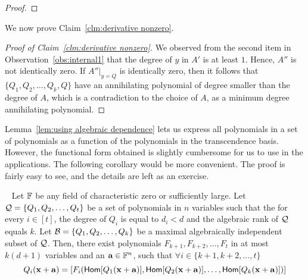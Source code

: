\begin{proof}
\end{proof}

We now prove Claim~\ref{clm:derivative nonzero}.
\begin{proof}[Proof of Claim~\ref{clm:derivative nonzero}]
We observed from the second item in Observation~\ref{obs:internal1} that the degree of $y$ in $A'$ is at least $1$. Hence, $A''$ is not identically zero.  
If $A''|_{y = Q}$ is identically zero, then it follows that $\{Q_1, Q_2, \ldots, Q_k, Q\}$ have an annihilating polynomial of degree smaller than the degree of $A$, which is a contradiction to the choice of $A$, as a minimum degree annihilating polynomial. 
\end{proof}

Lemma~\ref{lem:using algebraic dependence} lets us express all polynomials in a set of polynomials as a function of the polynomials in the transcendence basis. However, the functional form obtained is slightly cumbersome for us to use in the applications. The following corollary would be more convenient. The proof is fairly easy to see, and the details are left as an exercise. 

\begin{corollary}~\label{cor:using algebraic independence new}
Let $\mathbb{F}$ be any  field of characteristic zero or sufficiently large. Let ${\cal Q} = \{Q_1, Q_2, \ldots, Q_t\}$ be a set of polynomials in $n$ variables such that the for every $i \in [t]$, the degree of  $Q_i$ is equal to $d_i < d$ and  the algebraic rank of ${\cal Q}$ equals $k$. Let  ${\cal B} = \{Q_1, Q_2, \ldots, Q_k\}$ be a maximal algebraically independent subset of ${\cal Q}$. Then, there exist polynomials $F_{k+1}, F_{k+2}, \ldots, F_{t}$  in at most $k(d+1)$  variables and an $\mathbf{a} \in \mathbb{F}^n$, such that $\forall i \in \{k+1, k+2, \ldots, t\}$
$$Q_i(\mathbf{x} + \mathbf{a}) = \left[F_i(\mathsf{Hom}[Q_1(\mathbf{x} + \mathbf{a})], \mathsf{Hom}[Q_2(\mathbf{x} + \mathbf{a})], \ldots, \mathsf{Hom}[Q_k(\mathbf{x} + \mathbf{a})]) \right] $$
\end{corollary}



